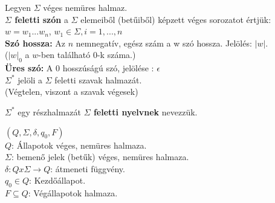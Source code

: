 \begin{frame}
\begin{tcolorbox}[title={Def.: $\Sigma$ feletti szó}]
Legyen $\Sigma$ véges nemüres halmaz.\\
\mmedskip
\textbf{$\Sigma$ feletti szón} a $\Sigma$ elemeiből (betűiből) képzett véges sorozatot értjük: \\
\mmedskip
$w = w_1 ... w_n$, $w_1 \in {\Sigma}, i = 1, ..., n$\\
\mmedskip
\textbf{Szó hossza:} Az $n$ nemnegatív, egész szám a w szó hossza. Jelölés: $|w|$.\\
($|w|_0$ a $w$-ben található $0$-k száma.)\\
\mmedskip
\textbf{Üres szó:} A $0$ hosszúságú szó, jelölése : $\epsilon$\\
\mmedskip
${\Sigma}^*$ jelöli a $\Sigma$ feletti szavak halmazát.\\
(Végtelen, viszont a szavak végesek)
\end{tcolorbox}

\begin{tcolorbox}[title={Def.: $\Sigma$ feletti nyelv}]
${\Sigma}^*$ egy részhalmazát \textbf{$\Sigma$ feletti nyelvnek} nevezzük.
\end{tcolorbox}

\begin{tcolorbox}[title={Def.: Véges automata}]
\textbf{$(Q, {\Sigma}, {\delta}, q_0, F)$}\\
\mmedskip
$Q$: Állapotok véges, nemüres halmaza.\\
\mmedskip
$\Sigma$: bemenő jelek (betűk) véges, nemüres halmaza.\\
\mmedskip
$\delta : Q x \Sigma \rightarrow Q$: átmeneti függvény.\\
\mmedskip
$q_0 \in Q$: Kezdőállapot.\\
\mmedskip
$F \subseteq Q$: Végállapotok halmaza.\\
\end{tcolorbox}

\end{frame}

